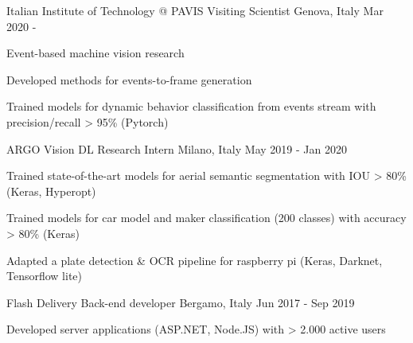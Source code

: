 

\begin{cventries}

\cventry
{Italian Institute of Technology @ PAVIS} %
{Visiting Scientist } %
{Genova, Italy} %
{Mar 2020 - } %
{
	\begin{cvitems} %
		\item Event-based machine vision research
		\item Developed methods for events-to-frame generation
		\item Trained models for dynamic behavior classification from events stream with precision/recall > 95\% (Pytorch)
	\end{cvitems}
}

  \cventry
    {ARGO Vision} %
    {DL Research Intern} %
    {Milano, Italy} %
    {May 2019 - Jan 2020} %
    {
      \begin{cvitems} %
      \item Trained state-of-the-art models for aerial semantic segmentation  with IOU > 80\% (Keras, Hyperopt)
	  \item Trained models for car model and maker classification (200 classes) with accuracy > 80\%   (Keras)
	  \item Adapted a plate detection \& OCR pipeline for raspberry pi (Keras, Darknet, Tensorflow lite)
      \end{cvitems}
    }

  \cventry
    {Flash Delivery} %
     {Back-end developer} %
    {Bergamo, Italy} %
    {Jun 2017 - Sep 2019} %
    {
      \begin{cvitems} %
	    \item Developed server applications (ASP.NET, Node.JS) with > 2.000 active users
      \end{cvitems}
    }


\end{cventries}
